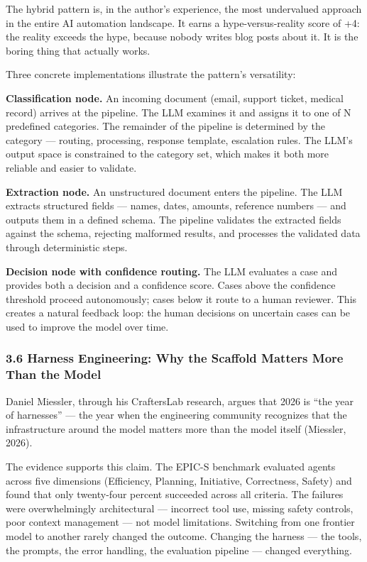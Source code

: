 \documentclass[11pt, a4paper]{article}
\begin{document}
The hybrid pattern is, in the author's experience, the most undervalued
approach in the entire AI automation landscape. It earns a
hype-versus-reality score of +4: the reality exceeds the hype, because
nobody writes blog posts about it. It is the boring thing that actually
works.

Three concrete implementations illustrate the pattern's versatility:

\textbf{Classification node.} An incoming document (email, support
ticket, medical record) arrives at the pipeline. The LLM examines it and
assigns it to one of N predefined categories. The remainder of the
pipeline is determined by the category --- routing, processing, response
template, escalation rules. The LLM's output space is constrained to the
category set, which makes it both more reliable and easier to validate.

\textbf{Extraction node.} An unstructured document enters the pipeline.
The LLM extracts structured fields --- names, dates, amounts, reference
numbers --- and outputs them in a defined schema. The pipeline validates
the extracted fields against the schema, rejecting malformed results,
and processes the validated data through deterministic steps.

\textbf{Decision node with confidence routing.} The LLM evaluates a case
and provides both a decision and a confidence score. Cases above the
confidence threshold proceed autonomously; cases below it route to a
human reviewer. This creates a natural feedback loop: the human
decisions on uncertain cases can be used to improve the model over time.

\hypertarget{harness-engineering-why-the-scaffold-matters-more-than-the-model}{%
\subsubsection{3.6 Harness Engineering: Why the Scaffold Matters More
Than the
Model}\label{harness-engineering-why-the-scaffold-matters-more-than-the-model}}

Daniel Miessler, through his CraftersLab research, argues that 2026 is
``the year of harnesses'' --- the year when the engineering community
recognizes that the infrastructure around the model matters more than
the model itself (Miessler, 2026).

The evidence supports this claim. The EPIC-S benchmark evaluated agents
across five dimensions (Efficiency, Planning, Initiative, Correctness,
Safety) and found that only twenty-four percent succeeded across all
criteria. The failures were overwhelmingly architectural --- incorrect
tool use, missing safety controls, poor context management --- not model
limitations. Switching from one frontier model to another rarely changed
the outcome. Changing the harness --- the tools, the prompts, the error
handling, the evaluation pipeline --- changed everything.
\end{document}

